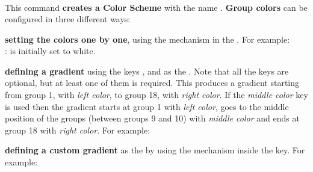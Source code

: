 \subsubsection*{}{\pgfPTMlibsubsubsection{\tmpSection}}\vspace{6pt}%
\label{command:pgfPTGroupColors}%
%
\\ [10pt]This command \textbf{creates a Color Scheme} with the name . \textbf{Group colors} can be configured in three different ways:
\vspace{4pt}
\begin{itemlist}
\item\textbf{setting the colors one by one}, using the \textit{} mechanism in the . For example:
\\ [3pt]:  is initially set to white.
\item\textbf{defining a gradient} using the keys ,  and  as the . Note that all the keys are optional, but at least one of them is required. This produces a gradient starting from group 1, with \textit{left color}, to group 18, with \textit{right color}. If the \textit{middle color} key is used then the gradient starts at group 1 with \textit{left color}, goes to the middle position of the groups (between groups 9 and 10) with \textit{middle color} and ends at group 18 with \textit{right color}. For example:
\item\textbf{defining a custom gradient} as the  by using the \textit{} mechanism inside the  key. For example:
\end{itemlist}
